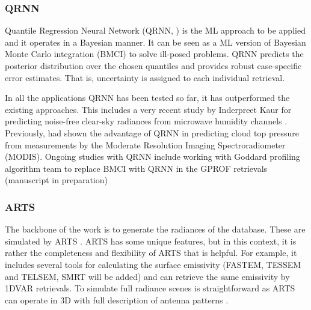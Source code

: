 \documentclass[12pt,oneside,a4paper]{article}
\begin{document}


 
\subsubsection{QRNN}
%
\label{sec:qrnn}

Quantile Regression Neural Network (QRNN, \citet{pfreundschuh:aneur:18}) is the
ML approach to be applied and it operates in a Bayesian manner. It can be seen
as a ML version of Bayesian Monte Carlo integration (BMCI) to solve ill-posed
problems. QRNN predicts the posterior distribution over the chosen quantiles
and provides robust case-specific error estimates. That is, uncertainty is
assigned to each individual retrieval.


In all the applications QRNN has been tested so far, it has outperformed the
existing approaches. This includes a very recent study by Inderpreet Kaur for
predicting noise-free clear-sky radiances from microwave humidity channels
\citep{kaur:2021:canma}. Previously, \citet{pfreundschuh:aneur:18} had shown
the advantage of QRNN in predicting cloud top pressure from measurements by the
Moderate Resolution Imaging Spectroradiometer (MODIS). Ongoing studies with
QRNN include working with Goddard profiling algorithm \citep[GPROF,][]
{kummerow:2015:thevo} team to replace BMCI with QRNN in the GPROF retrievals
(manuscript in preparation)


\subsubsection{ARTS}
\label{sec:arts}
% 
The backbone of the work is to generate the radiances of the database. These
are simulated by ARTS \citep[Atmospheric Radiative Transfer Simulator,][]
{eriksson:arts2:11}. ARTS has some unique features, but in this context,
it is rather the completeness and flexibility of ARTS that is helpful. For
example, it includes several tools for calculating the surface emissivity
(FASTEM, TESSEM and TELSEM, SMRT will be added) and can retrieve the same
emissivity by 1DVAR retrievals. To simulate full radiance scenes is
straightforward as ARTS can operate in 3D with full description of antenna
patterns \citep{duncan:anexp:19}.
\end{document}
